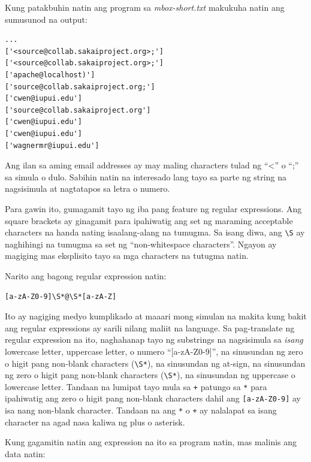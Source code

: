 \documentclass[10pt,]{book}
\begin{document}
Kung patakbuhin natin ang program sa \emph{mbox-short.txt} makukuha
natin ang sumusunod na output:

{\small
\begin{verbatim}
...
['<source@collab.sakaiproject.org>;']
['<source@collab.sakaiproject.org>;']
['apache@localhost)']
['source@collab.sakaiproject.org;']
['cwen@iupui.edu']
['source@collab.sakaiproject.org']
['cwen@iupui.edu']
['cwen@iupui.edu']
['wagnermr@iupui.edu']
\end{verbatim}
}

Ang ilan sa aming email addresses ay may maling characters tulad ng
``\textless{}'' o ``;'' sa simula o dulo. Sabihin natin na interesado
lang tayo sa parte ng string na nagsisimula at nagtatapos sa letra o
numero.

Para gawin ito, gumagamit tayo ng iba pang feature ng regular
expressions. Ang square brackets ay ginagamit para ipahiwatig ang set ng
maraming acceptable characters na handa nating isaalang-alang na
tumugma. Sa isang diwa, ang \texttt{\textbackslash{}S} ay naghihingi na
tumugma sa set ng ``non-whitespace characters''. Ngayon ay magiging mas
eksplisito tayo sa mga characters na tutugma natin.

Narito ang bagong regular expression natin:

{\small
\begin{verbatim}
[a-zA-Z0-9]\S*@\S*[a-zA-Z]
\end{verbatim}
}

Ito ay nagiging medyo kumplikado at maaari mong simulan na makita kung
bakit ang regular expressions ay sarili nilang maliit na language. Sa
pag-translate ng regular expression na ito, naghahanap tayo ng
substrings na nagsisimula sa \emph{isang} lowercase letter, uppercase
letter, o numero ``{[}a-zA-Z0-9{]}'', na sinusundan ng zero o higit pang
non-blank characters (\texttt{\textbackslash{}S*}), na sinusundan ng
at-sign, na sinusundan ng zero o higit pang non-blank characters
(\texttt{\textbackslash{}S*}), na sinusundan ng uppercase o lowercase
letter. Tandaan na lumipat tayo mula sa \texttt{+} patungo sa \texttt{*}
para ipahiwatig ang zero o higit pang non-blank characters dahil ang
\texttt{{[}a-zA-Z0-9{]}} ay isa nang non-blank character. Tandaan na ang
\texttt{*} o \texttt{+} ay nalalapat sa isang character na agad nasa
kaliwa ng plus o asterisk.


Kung gagamitin natin ang expression na ito sa program natin, mas malinis
ang data natin:
\end{document}
